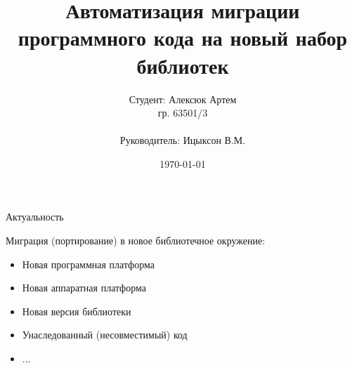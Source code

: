 \documentclass[12pt]{beamer}
\title{Автоматизация миграции программного кода на новый набор библиотек}
\date{\today}
\author[Алексюк Артем]{
	Студент: Алексюк Артем\\
	гр. 63501/3\\ \\
	Руководитель: Ицыксон В.М.\\
}
\begin{document}
\maketitle




{
\begin{frame}{Актуальность}
\begin{mybox}[]
Миграция (портирование) в новое библиотечное окружение:
\begin{itemize}
	\item Новая программная платформа
	\item Новая аппаратная платформа
	\item Новая версия библиотеки
	\item Унаследованный (несовместимый) код 
	\item ...		
\end{itemize}
\end{mybox}
\end{frame}
}
\end{document}

